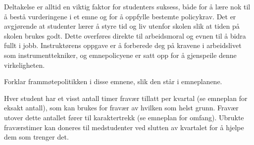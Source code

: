
Deltakelse er alltid en viktig faktor for studenters suksess, både for å lære nok til å bestå vurderingene i et emne og for å oppfylle bestemte policykrav. Det er avgjørende at studenter lærer å styre tid og liv utenfor skolen slik at tiden på skolen brukes godt. Dette overføres direkte til arbeidsmoral og evnen til å bidra fullt i jobb. Instruktørens oppgave er å forberede deg på kravene i arbeidslivet som instrumenttekniker, og emnepolicyene er satt opp for å gjenspeile denne virkeligheten.

\vskip 10pt

Forklar frammøtepolitikken i disse emnene, slik den står i emneplanene.







Hver student har et visst antall timer fravær tillatt per kvartal (se emneplan for eksakt antall), som kan brukes for fravær av hvilken som helst grunn. Fravær utover dette antallet fører til karaktertrekk (se emneplan for omfang). Ubrukte fraværstimer kan doneres til medstudenter ved slutten av kvartalet for å hjelpe dem som trenger det.









